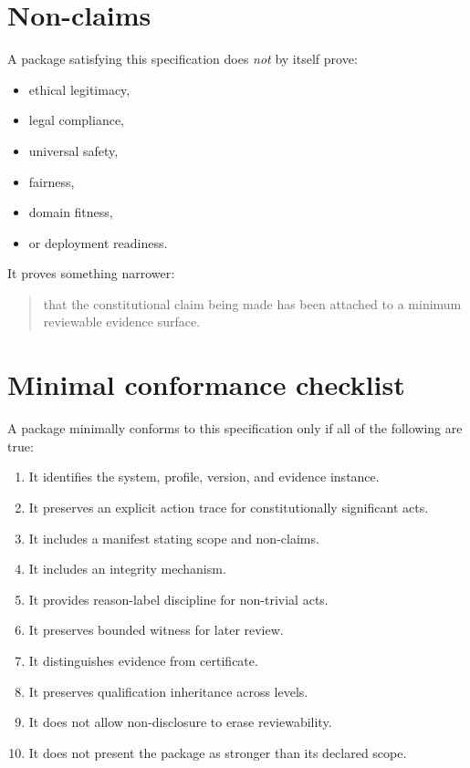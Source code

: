 \documentclass[11pt]{article}
\begin{document}
\section{Non-claims}

A package satisfying this specification does \emph{not} by itself prove:
\begin{itemize}[leftmargin=2em]
    \item ethical legitimacy,
    \item legal compliance,
    \item universal safety,
    \item fairness,
    \item domain fitness,
    \item or deployment readiness.
\end{itemize}

It proves something narrower:

\begin{quote}
that the constitutional claim being made has been attached to a minimum reviewable evidence surface.
\end{quote}

\section{Minimal conformance checklist}

A package minimally conforms to this specification only if all of the following are true:

\begin{enumerate}[leftmargin=2em,label=\arabic*.]
    \item It identifies the system, profile, version, and evidence instance.
    \item It preserves an explicit action trace for constitutionally significant acts.
    \item It includes a manifest stating scope and non-claims.
    \item It includes an integrity mechanism.
    \item It provides reason-label discipline for non-trivial acts.
    \item It preserves bounded witness for later review.
    \item It distinguishes evidence from certificate.
    \item It preserves qualification inheritance across levels.
    \item It does not allow non-disclosure to erase reviewability.
    \item It does not present the package as stronger than its declared scope.
\end{enumerate}
\end{document}
